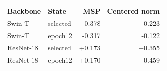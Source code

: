 \begin{tabular}{llrr}
\toprule
Backbone & State & MSP & Centered norm \\
\midrule
Swin-T & selected & -0.378 & -0.223 \\
Swin-T & epoch12 & -0.317 & -0.122 \\
ResNet-18 & selected & +0.173 & +0.355 \\
ResNet-18 & epoch12 & +0.170 & +0.459 \\
\bottomrule
\end{tabular}
